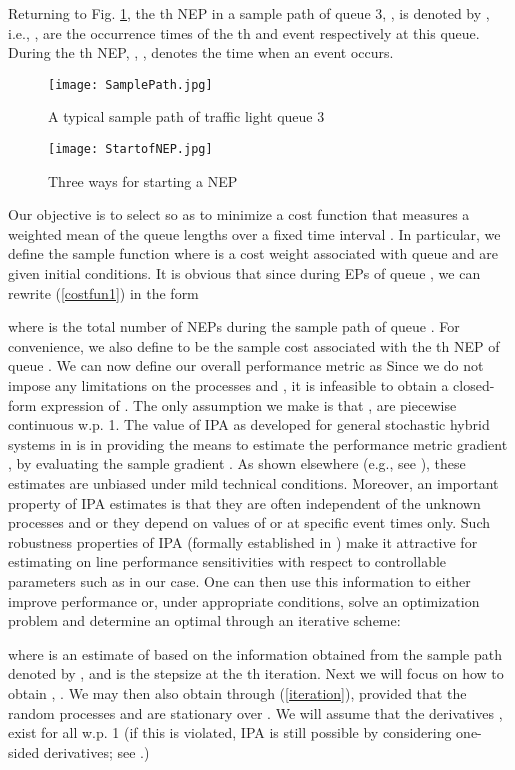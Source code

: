 \documentclass{ifacconf}\usepackage{graphicx}
\begin{document}
Returning to Fig. \ref{SamplePath}, the th NEP in a sample path of queue 3,
, is denoted by , i.e., ,
 are the occurrence times of the th  and  event
respectively at this queue. During the th NEP, ,
, denotes the time when an event occurs.

\begin{figure}[tbh]
\centering
\texttt{[image: SamplePath.jpg]}\caption{A typical sample path of
traffic light queue 3}\label{SamplePath}\end{figure}

\begin{figure}[tbh]
\centering
\texttt{[image: StartofNEP.jpg]} \caption{Three ways for starting
a NEP}\label{StartofNEP}\end{figure}

Our objective is to select  so as to minimize a cost function that
measures a weighted mean of the queue lengths over a fixed time interval
. In particular, we define the sample function
where  is a cost weight associated with queue  and  are
given initial conditions. It is obvious that since  during EPs of
queue , we can rewrite (\ref{costfun1}) in the form

where  is the total number of NEPs during the sample path of queue .
For convenience, we also define
to be the sample cost associated with the th NEP of queue . We can now
define our overall performance metric as
Since we do not impose any limitations on the processes 
and , it is infeasible to obtain a closed-form expression of
. The only assumption we make is that ,
 are piecewise continuous w.p. 1. The value of IPA as developed
for general stochastic hybrid systems in \cite{Cassandras10} is in providing
the means to estimate the performance metric gradient , by
evaluating the sample gradient . As shown elsewhere (e.g.,
see \cite{Cassandras10}), these estimates are unbiased under mild technical
conditions. Moreover, an important property of IPA estimates is that they are
often independent of the unknown processes  and
 or they depend on values of  or  at specific event times only. Such robustness properties of IPA
(formally established in \cite{YaoCgc11}) make it attractive for estimating on
line performance sensitivities with respect to controllable parameters such as
 in our case. One can then use this information to either improve
performance or, under appropriate conditions, solve an optimization problem
and determine an optimal  through an iterative scheme:

where  is an estimate of  based on the information obtained from the sample path denoted by
, and  is the stepsize at the th iteration. Next we
will focus on how to obtain , . We may then also
obtain  through (\ref{iteration}), provided that the random
processes  and  are stationary over
. We will assume that the derivatives , exist for all
 w.p. 1 (if this is violated, IPA is still
possible by considering one-sided derivatives; see \cite{Cassandras02}.)
\end{document}
